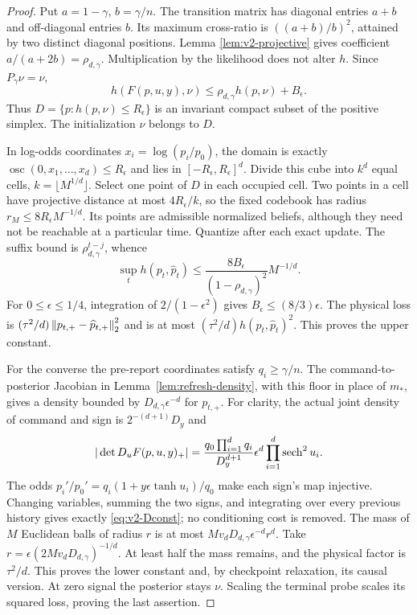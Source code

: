 \begin{proof}
Put $a=1-\gamma$, $b=\gamma/n$. The transition matrix has diagonal
entries $a+b$ and off-diagonal entries $b$. Its maximum cross-ratio is
$((a+b)/b)^2$, attained by two distinct diagonal positions. Lemma
\ref{lem:v2-projective} gives coefficient $a/(a+2b)=\rho_{d,\gamma}$.
Multiplication by the likelihood does not alter $h$. Since $P_\gamma\nu=\nu$,
\[
 h(F(p,u,y),\nu)\le\rho_{d,\gamma}h(p,\nu)+B_\epsilon.
\]
Thus $D=\{p:h(p,\nu)\le R_\epsilon\}$ is an invariant compact subset
of the positive simplex. The initialization $\nu$ belongs to $D$.

In log-odds coordinates $x_i=\log(p_i/p_0)$, the domain is exactly
$\operatorname{osc}(0,x_1,\ldots,x_d)\le R_\epsilon$ and lies in
$[-R_\epsilon,R_\epsilon]^d$. Divide this cube into $k^d$ equal cells,
$k=\lfloor M^{1/d}\rfloor$. Select one point of $D$ in each occupied
cell. Two points in a cell have projective distance at most
$4R_\epsilon/k$, so the fixed codebook has radius
$r_M\le8R_\epsilon M^{-1/d}$. Its points are admissible normalized
beliefs, although they need not be reachable at a particular time.
Quantize after each exact update. The suffix bound is
$\rho_{d,\gamma}^{t-j}$, whence
\[
 \sup_t h(p_t,\widehat p_t)
 \le\frac{8B_\epsilon}{(1-\rho_{d,\gamma})^2}M^{-1/d}.
\]
For $0\le\epsilon\le1/4$, integration of $2/(1-\epsilon^2)$ gives
$B_\epsilon\le(8/3)\epsilon$. The physical loss is
$(\tau^2/d)\left\lVert p_{t,+}-\widehat p_{t,+}\right\rVert_2^2$ and is at most
$(\tau^2/d)h(p_t,\widehat p_t)^2$. This proves the upper constant.

For the converse the pre-report coordinates satisfy $q_i\ge\gamma/n$.
The command-to-posterior Jacobian in
Lemma~\ref{lem:refresh-density}, with this floor in place of $m_*$,
gives a density bounded by $D_{d,\gamma}\epsilon^{-d}$ for $p_{t,+}$.
For clarity, the actual joint density of command and sign is
$2^{-(d+1)}D_y$ and
\[
 |\det D_uF(p,u,y)_+|
 =\frac{q_0\prod_{i=1}^dq_i}{D_y^{d+1}}
       \epsilon^d\prod_{i=1}^d\operatorname{sech}^2u_i.
\]
The odds $p_i'/p_0'=q_i(1+y\epsilon\tanh u_i)/q_0$ make each sign's
map injective. Changing variables, summing the two signs, and integrating
over every previous history gives exactly \eqref{eq:v2-Dconst}; no
conditioning cost is removed. The mass of $M$ Euclidean balls of radius
$r$ is at most $Mv_dD_{d,\gamma}\epsilon^{-d}r^d$. Take
$r=\epsilon(2Mv_dD_{d,\gamma})^{-1/d}$.
At least half the mass remains, and the physical factor is $\tau^2/d$.
This proves the lower constant and, by checkpoint relaxation, its causal
version. At zero signal the posterior stays $\nu$. Scaling the terminal
probe scales its squared loss, proving the last assertion.
\end{proof}

